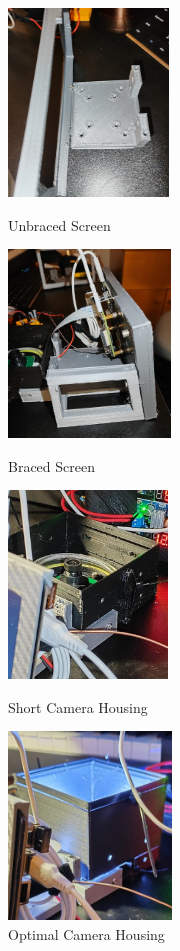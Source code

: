 \begin{figure}[t]
  \begin{minipage}[t]{0.24\textwidth}
    \centering
    \includegraphics[width=\textwidth,height=5cm, keepaspectratio]{imgs/design/unbracedscreen.jpeg}
    \caption{Unbraced Screen}
    \label{fig:unbracedscreen}
  \end{minipage}
  \hfill
  \begin{minipage}[t]{0.24\textwidth}
    \centering
    \includegraphics[width=\textwidth,height=5cm, keepaspectratio]{imgs/design/bracedscreen.jpeg}
    \caption{Braced Screen}
    \label{fig:bracedscreen}
  \end{minipage}
  \hfill
  \begin{minipage}[t]{0.24\textwidth}
    \centering
    \includegraphics[width=\textwidth,height=5cm, keepaspectratio]{imgs/design/shortcamera.jpeg}
    \caption{Short Camera Housing}
    \label{fig:shortcamera}
  \end{minipage}
  \hfill
  \begin{minipage}[t]{0.24\textwidth}
    \centering
    \includegraphics[width=\textwidth,height=5cm, keepaspectratio]{imgs/design/tallcamera.jpeg}
    \caption{Optimal Camera Housing}
    \label{fig:tallcamera}
  \end{minipage}
\end{figure}
